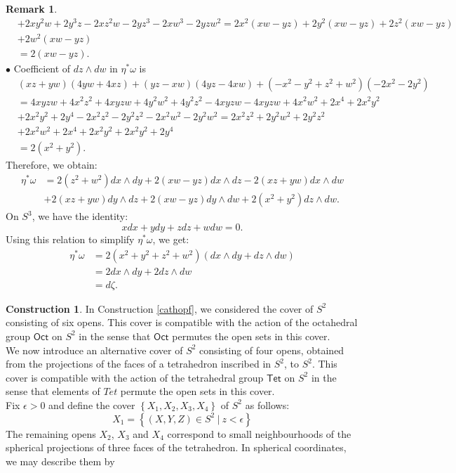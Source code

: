\documentclass{article}
\theoremstyle{plain}
\theoremstyle{definition}
\newtheorem{rem}[thm]{Remark}
\newtheorem{const}[thm]{Construction}
\begin{document}
\begin{appendices}
\begin{rem}
\begin{align*}
& +2xy^2w+2y^3z-2xz^2w-2yz^3-2xw^3-2yzw^2 = 2x^2(xw-yz) + 2y^2(xw-yz) + 2z^2(xw-yz) \\
& +2w^2(xw-yz) \\
& = 2(xw-yz).
\end{align*}
$\bullet$ Coefficient of $dz \wedge dw$ in $\eta^\ast\omega$ is
\begin{align*}
& (xz+yw)(4yw+4xz) + (yz-xw)(4yz-4xw) + (-x^2-y^2+z^2+w^2)(-2x^2-2y^2) \\
& = 4xyzw+4x^2z^2+4xyzw+4y^2w^2+4y^2z^2-4xyzw-4xyzw+4x^2w^2+2x^4+2x^2y^2 \\
& +2x^2y^2+2y^4-2x^2z^2-2y^2z^2-2x^2w^2-2y^2w^2 = 2x^2z^2+2y^2w^2+2y^2z^2 \\
& +2x^2w^2+2x^4+2x^2y^2+2x^2y^2+2y^4 \\
& = 2(x^2+y^2).
\end{align*}
Therefore, we obtain:
\begin{align*}
\eta^\ast\omega & = 2(z^2+w^2)dx \wedge dy + 2(xw-yz)dx \wedge dz - 2(xz+yw)dx \wedge dw \\
& + 2(xz+yw)dy \wedge dz + 2(xw-yz)dy \wedge dw + 2(x^2+y^2)dz \wedge dw.
\end{align*}
On $S^3$, we have the identity:
\[
xdx+ydy+zdz+wdw=0.
\]
Using this relation to simplify $\eta^\ast\omega$, we get:
\begin{align*}
\eta^\ast\omega & = 2(x^2+y^2+z^2+w^2)(dx \wedge dy + dz \wedge dw) \\
& = 2dx \wedge dy + 2dz \wedge dw \\
& = d\zeta.
\end{align*}
\end{rem}
\begin{const}\label{fouropens}
In Construction \ref{cathopf}, we considered the cover of $S^2$ consisting of six opens. This cover is compatible with the action of the octahedral group $\mathsf{Oct}$ on $S^2$ in the sense that $\mathsf{Oct}$ permutes the open sets in this cover. \\
We now introduce an alternative cover of $S^2$ consisting of four opens, obtained from the projections of the faces of a tetrahedron inscribed in $S^2$, to $S^2$. This cover is compatible with the action of the tetrahedral group $\mathsf{Tet}$ on $S^2$ in the sense that elements of $Tet$ permute the open sets in this cover. \\
Fix $\epsilon > 0$ and define the cover $\left\{X_1,X_2,X_3,X_4\right\}$ of $S^2$ as follows:
\[
X_1 = \left\{(X,Y,Z) \in S^2 ~ \big\vert ~ z < \epsilon\right\}
\]
The remaining opens $X_2$, $X_3$ and $X_4$ correspond to small neighbourhoods of the spherical projections of three faces of the tetrahedron. In spherical coordinates, we may describe them by

\end{const}
\end{appendices}
\end{document}
